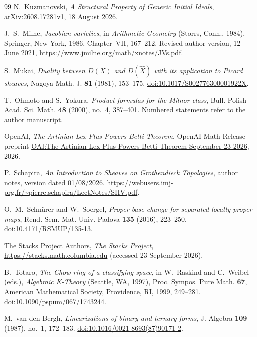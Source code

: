 \begin{thebibliography}{99}
N.~Kuzmanovski,
\emph{A Structural Property of Generic Initial Ideals},
\href{https://arxiv.org/abs/2608.17281v1}{arXiv:2608.17281v1},
18 August 2026.

J.~S.~Milne,
\emph{Jacobian varieties},
in \emph{Arithmetic Geometry} (Storrs, Conn., 1984),
Springer, New York, 1986, Chapter~VII, 167--212.
Revised author version, 12 June 2021,
\url{https://www.jmilne.org/math/xnotes/JVs.pdf}.

S.~Mukai,
\emph{Duality between $D(X)$ and $D(\widehat X)$ with its application
to Picard sheaves},
Nagoya Math. J. \textbf{81} (1981), 153--175.
\href{https://doi.org/10.1017/S002776300001922X}{doi:10.1017/S002776300001922X}.

T.~Ohmoto and S.~Yokura,
\emph{Product formulas for the Milnor class},
Bull. Polish Acad. Sci. Math. \textbf{48} (2000), no.~4, 387--401.
Numbered statements refer to the
\href{https://www.math.sci.hokudai.ac.jp/~ohmoto/Papers/Productfinal.pdf}{author manuscript}.

OpenAI,
\emph{The Artinian Lex-Plus-Powers Betti Theorem},
OpenAI Math Release preprint
\href{https://github.com/openai/math/blob/main/preprints/The-Artinian-Lex-Plus-Powers-Betti-Theorem-September-23-2026/paper.pdf}{OAI:The-Artinian-Lex-Plus-Powers-Betti-Theorem-September-23-2026},
2026.

P.~Schapira,
\emph{An Introduction to Sheaves on Grothendieck Topologies},
author notes, version dated 01/08/2026.
\url{https://webusers.imj-prg.fr/~pierre.schapira/LectNotes/SHV.pdf}.

O.~M.~Schn\"urer and W.~Soergel,
\emph{Proper base change for separated locally proper maps},
Rend. Sem. Mat. Univ. Padova \textbf{135} (2016), 223--250.
\href{https://doi.org/10.4171/RSMUP/135-13}{doi:10.4171/RSMUP/135-13}.

The Stacks Project Authors,
\emph{The Stacks Project},
\url{https://stacks.math.columbia.edu}
(accessed 23 September 2026).

B.~Totaro,
\emph{The Chow ring of a classifying space},
in W.~Raskind and C.~Weibel (eds.),
\emph{Algebraic K-Theory} (Seattle, WA, 1997),
Proc. Sympos. Pure Math. \textbf{67},
American Mathematical Society, Providence, RI, 1999, 249--281.
\href{https://doi.org/10.1090/pspum/067/1743244}{doi:10.1090/pspum/067/1743244}.

M.~van den Bergh,
\emph{Linearizations of binary and ternary forms},
J. Algebra \textbf{109} (1987), no.~1, 172--183.
\href{https://doi.org/10.1016/0021-8693(87)90171-2}{doi:10.1016/0021-8693(87)90171-2}.

\end{thebibliography}
